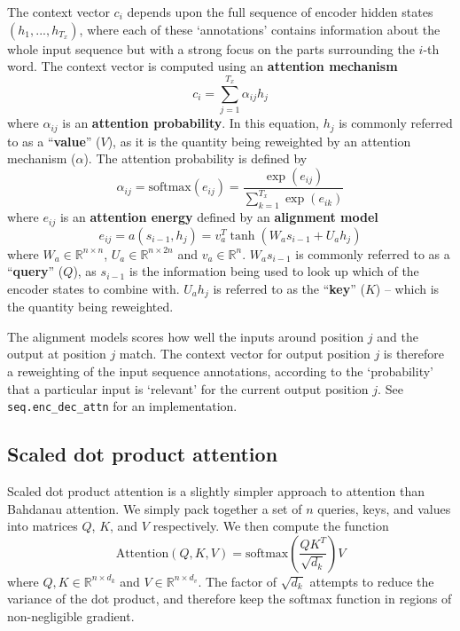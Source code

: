 \documentclass[11pt]{article}
\numberwithin{equation}{section}
\begin{document}
The context vector $c_i$ depends upon the full sequence of encoder hidden states $(h_1, ..., h_{T_x})$, where each of these `annotations' contains information about the whole input sequence but with a strong focus on the parts surrounding the $i$-th word. The context vector is computed using an \textbf{attention mechanism}
\begin{equation}
c_i = \sum_{j=1}^{T_x} \alpha_{ij} h_j \label{eq:bah-attn-mech}
\end{equation}
where $\alpha_{ij}$ is an \textbf{attention probability}. In this equation, $h_j$ is commonly referred to as a ``\textbf{value}'' ($V$), as it is the quantity being reweighted by an attention mechanism ($\alpha$). The attention probability is defined by
\begin{equation}
\alpha_{ij} = \text{softmax}\left( e_{ij} \right) = \frac{\exp(e_{ij})}{\sum_{k=1}^{T_x}\exp(e_{ik})}
\end{equation}
where $e_{ij}$ is an \textbf{attention energy} defined by an \textbf{alignment model}
\begin{equation}
e_{ij} = a(s_{i-1}, h_j) = v_a^T \tanh(W_a s_{i-1} + U_a h_j)
\end{equation}
where $W_a \in \mathbb{R}^{n \times n}$, $U_a \in \mathbb{R}^{n \times 2n}$ and $v_a \in \mathbb{R}^n$. $W_a s_{i-1}$ is commonly referred to as a ``\textbf{query}'' ($Q$), as $s_{i-1}$ is the information being used to look up which of the encoder states to combine with. $U_a h_j$ is referred to as the ``\textbf{key}'' ($K$) -- which is the quantity being reweighted.

The alignment models scores how well the inputs around position $j$ and the output at position $j$ match. The context vector for output position $j$ is therefore a reweighting of the input sequence annotations, according to the `probability' that a particular input is `relevant' for the current output position $j$. See \verb#seq.enc_dec_attn# for an implementation.

\subsection{Scaled dot product attention} \label{sec:dp-attn}
Scaled dot product attention is a slightly simpler approach to attention than Bahdanau attention. We simply pack together a set of $n$ queries, keys, and values into matrices $Q$, $K$, and $V$ respectively. We then compute the function
\begin{equation}
\text{Attention}(Q, K, V) = \text{softmax}\left( \frac{QK^T}{\sqrt{d_k}} \right) V \label{eq:dot-prod-attn}
\end{equation}
where $Q, K \in \mathbb{R}^{n \times d_k}$ and $V \in \mathbb{R}^{n \times d_v}$. The factor of $\sqrt{d_k}$ attempts to reduce the variance of the dot product, and therefore keep the softmax function in regions of non-negligible gradient.
\end{document}
